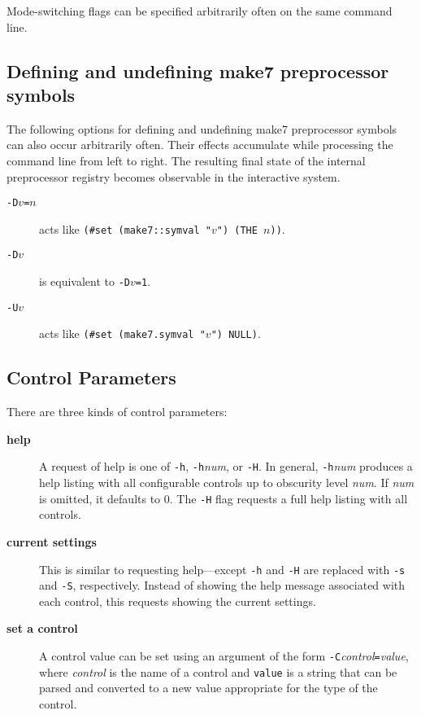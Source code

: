 Mode-switching flags can be specified arbitrarily often on the same
command line.

\subsection{Defining and undefining make7 preprocessor symbols}
\label{sec:cmdline:defundef}

The following options for defining and undefining make7 preprocessor
symbols can also occur arbitrarily often.  Their effects accumulate
while processing the command line from left to right.  The resulting
final state of the internal preprocessor registry becomes observable
in the interactive system.

\begin{description}
\item[{\tt -D$v$=$n$}] acts like {\tt (\#set (make7::symval "$v$") (THE $n$))}.
\item[{\tt -D$v$}] is equivalent to {\tt -D$v$=1}.
\item[{\tt -U$v$}] acts like {\tt (\#set (make7.symval "$v$") NULL)}.
\end{description}

\subsection{Control Parameters}

There are three kinds of control parameters:

\begin{description}
\item[{\bf help}] A request of help is one of {\tt -h},
{\tt -h}{\it num}, or {\tt -H}.  In general, {\tt -h}{\it num}
produces a help listing with all configurable controls up to obscurity
level {\it num}.  If {\it num} is omitted, it defaults to 0.  The
{\tt -H} flag requests a full help listing with all controls.
\item[{\bf current settings}] This is similar to requesting
help---except {\tt -h} and {\tt -H} are replaced with {\tt -s} and
{\tt -S}, respectively.  Instead of showing the help message
associated with each control, this requests showing the current
settings.
\item[{\bf set a control}] A control value can be set using an
argument of the form {\tt -C}{\it control}{\tt =}{\it value}, where
{\it control} is the name of a control and {\tt value} is a string
that can be parsed and converted to a new value appropriate for the
type of the control.
\end{description}
